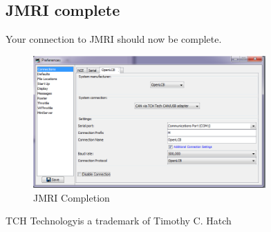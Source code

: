 \documentclass[15pt]{book}
\begin{document}
\subsection{JMRI complete }
Your connection to JMRI should now be complete.
\begin{figure}[htbp]
\begin{center}
\includegraphics[width=3.5in]{images/jmri_complete.png}
\caption{JMRI Completion}
\end{center}
\end{figure}

\printindex

\newpage


 TCH Technology\texttrademark is a trademark of Timothy C. Hatch
\end{document}
